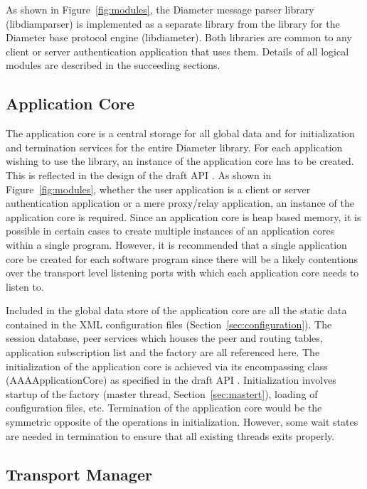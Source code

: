 \documentclass{article}
\begin{document}
As shown in Figure~\ref{fig:modules}, the Diameter message parser
library (libdiamparser) is implemented as a separate library from the
library for the Diameter base protocol engine (libdiameter).  Both
libraries are common to any client or server authentication application
that uses them. Details of all logical modules are described in the
succeeding sections.

\subsection{Application Core\label{sec:appcore}}

The application core is a central storage for all global data and for
initialization and termination services for the entire Diameter
library. For each application wishing to use the library, an instance of
the application core has to be created. This is reflected in the design
of the draft API \cite{api}. As shown in Figure~\ref{fig:modules}, whether
the user application is a client or server authentication application or
a mere proxy/relay application, an instance of the application core is
required. Since an application core is heap based memory, it is possible
in certain cases to create multiple instances of an application cores
within a single program. However, it is recommended that a single
application core be created for each software program since there will
be a likely contentions over the transport level listening ports with
which each application core needs to listen to.

Included in the global data store of the application core are all the
static data contained in the XML configuration files
(Section~\ref{sec:configuration}). The session database, peer services
which houses the peer and routing tables, application subscription list
and the factory are all referenced here.  The initialization of the
application core is achieved via its encompassing class
(AAAApplicationCore) as specified in the draft API
\cite{api}. Initialization involves startup of the factory (master
thread, Section~\ref{sec:mastert}), loading of configuration files,
etc. Termination of the application core would be the symmetric opposite
of the operations in initialization. However, some wait states are
needed in termination to ensure that all existing threads exits
properly.

\subsection{Transport Manager\label{sec:transport}}
\end{document}
